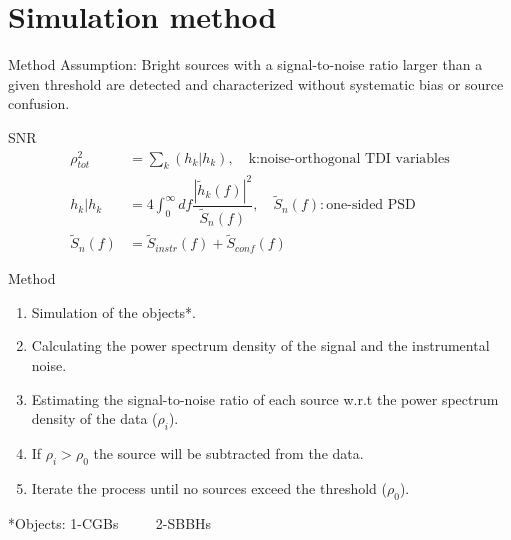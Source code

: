 \documentclass[pdf]{beamer}
\begin{document}
\section{Simulation method}


\begin{frame}{Method}
Assumption: Bright sources with a signal-to-noise ratio larger than a given threshold are detected and characterized without systematic bias or source confusion.

\begin{block}{SNR}
\begin{align*}
\rho^2_{tot} &= \sum_k (h_k|h_k), \quad  \text{k:noise-orthogonal TDI variables} \\
h_k|h_k &= 4 \int_{0}^{\infty} df \dfrac{|\tilde{h}_k(f)|^2}{\tilde{S}_n(f)}, \quad \tilde{S}_n(f):\text{one-sided PSD} \\
\tilde{S}_n(f) &= \tilde{S}_{instr}(f) +\tilde{S}_{conf}(f)
\end{align*}
\end{block}
\end{frame}

\begin{frame}{Method}
\begin{enumerate}
\item Simulation of the objects*.
\item Calculating the power spectrum density of the signal and the instrumental noise.
\item Estimating the signal-to-noise ratio of each source w.r.t the power spectrum density of the data ($\rho_i$).
\item If $\rho_i > \rho_0$ the source will be subtracted from the data.
\item Iterate the process until no sources exceed the threshold ($\rho_0$).
\end{enumerate}
\vspace{1cm}
\hspace{.5cm}
*Objects: 1-CGBs $\qquad$ 2-SBBHs
\end{frame}
\end{document}
